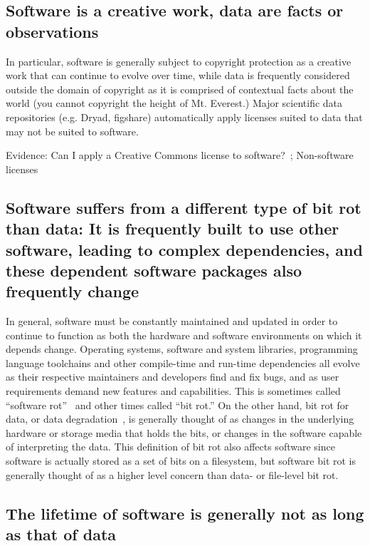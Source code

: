 \documentclass[fleqn,10pt]{wlpeerj} %
\begin{document}
\subsection*{Software is a creative work, data are facts or observations}

In particular, software is generally subject to copyright protection as a creative work that can continue to evolve over time, while data is frequently considered outside the domain of copyright as it is comprised of contextual facts about the world (you cannot copyright the height of Mt. Everest.) Major scientific data repositories (e.g. Dryad, figshare) automatically apply licenses suited to data that may not be suited to software.

Evidence: Can I apply a Creative Commons license to software?~\citep{CC-license}; Non-software licenses~\citep{choose-a-license}

\subsection*{Software suffers from a different type of bit rot than data: It is frequently built to use other software, leading to complex dependencies, and these dependent software packages also frequently change}

In general, software must be constantly maintained and updated in order to continue to function as both the hardware and software environments on which it depends change. Operating systems, software and system libraries, programming language toolchains and other compile-time and run-time dependencies all evolve as their respective maintainers and developers find and fix bugs, and as user requirements demand new features and capabilities. This is sometimes called ``software rot''~\citep{wiki-software-rot} and other times called ``bit rot.'' On the other hand, bit rot for data, or data degradation~\citep{wiki-data-degredation}, is generally thought of as changes in the underlying hardware or storage media that holds the bits, or changes in the software capable of interpreting the data. This definition of bit rot also affects software since software is actually stored as a set of bits on a filesystem, but software bit rot is generally thought of as a higher level concern than data- or file-level bit rot.

\subsection*{The lifetime of software is generally not as long as that of data}
\end{document}
